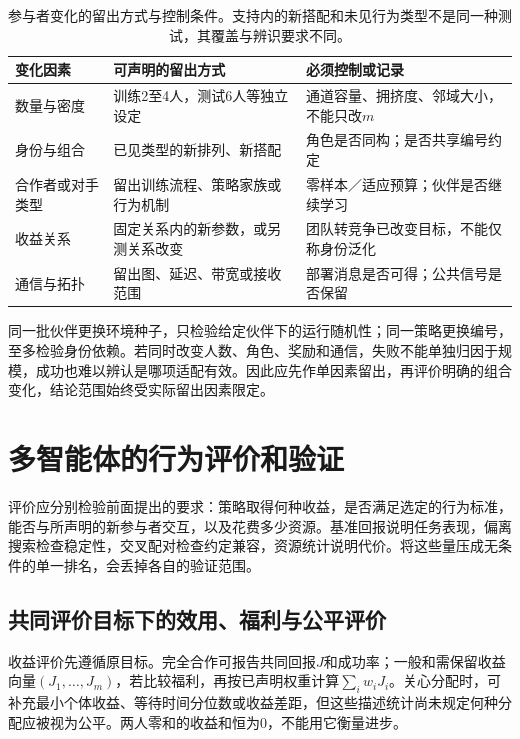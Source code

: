 \begin{table}[htbp]
 \centering
 \begin{tabularx}{\linewidth}{@{}l >{\raggedright\arraybackslash}X >{\raggedright\arraybackslash}X@{}}
 \toprule
 变化因素 & 可声明的留出方式 & 必须控制或记录\\
 \midrule
 数量与密度 & 训练2至4人，测试6人等独立设定 & 通道容量、拥挤度、邻域大小，不能只改$m$\\
 身份与组合 & 已见类型的新排列、新搭配 & 角色是否同构；是否共享编号约定\\
 合作者或对手类型 & 留出训练流程、策略家族或行为机制 & 零样本／适应预算；伙伴是否继续学习\\
 收益关系 & 固定关系内的新参数，或另测关系改变 & 团队转竞争已改变目标，不能仅称身份泛化\\
 通信与拓扑 & 留出图、延迟、带宽或接收范围 & 部署消息是否可得；公共信号是否保留\\
 \bottomrule
 \end{tabularx}
 \caption{参与者变化的留出方式与控制条件。支持内的新搭配和未见行为类型不是同一种测试，其覆盖与辨识要求不同。}
 \label{tab:rl-multi-agent-splits}
\end{table}

同一批伙伴更换环境种子，只检验给定伙伴下的运行随机性；同一策略更换编号，至多检验身份依赖。若同时改变人数、角色、奖励和通信，失败不能单独归因于规模，成功也难以辨认是哪项适配有效。因此应先作单因素留出，再评价明确的组合变化，结论范围始终受实际留出因素限定。

\section{多智能体的行为评价和验证}
\label{sec:rl-multi-agent-evaluation}

评价应分别检验前面提出的要求：策略取得何种收益，是否满足选定的行为标准，能否与所声明的新参与者交互，以及花费多少资源。基准回报说明任务表现，偏离搜索检查稳定性，交叉配对检查约定兼容，资源统计说明代价。将这些量压成无条件的单一排名，会丢掉各自的验证范围。

\subsection{共同评价目标下的效用、福利与公平评价}
\label{sec:rl-multi-agent-welfare}

收益评价先遵循原目标。完全合作可报告共同回报$J$和成功率；一般和需保留收益向量$(J_1,\ldots,J_m)$，若比较福利，再按已声明权重计算$\sum_iw_iJ_i$。关心分配时，可补充最小个体收益、等待时间分位数或收益差距，但这些描述统计尚未规定何种分配应被视为公平。两人零和的收益和恒为0，不能用它衡量进步。


